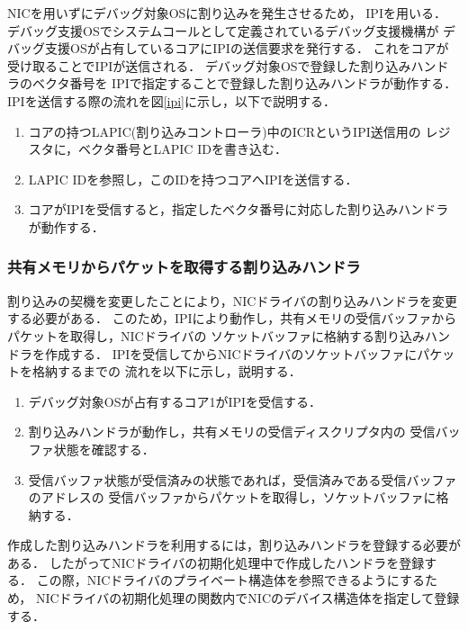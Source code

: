\documentclass[submit,techreq,noauthor,dvipdfmx]{ipsj}
\begin{document}

NICを用いずにデバッグ対象OSに割り込みを発生させるため，
IPIを用いる．
デバッグ支援OSでシステムコールとして定義されているデバッグ支援機構が
デバッグ支援OSが占有しているコアにIPIの送信要求を発行する．
これをコアが受け取ることでIPIが送信される．
デバッグ対象OSで登録した割り込みハンドラのベクタ番号を
IPIで指定することで登録した割り込みハンドラが動作する．
IPIを送信する際の流れを図\ref{ipi}に示し，以下で説明する．

\begin{enumerate}
    \item 
        コアの持つLAPIC(割り込みコントローラ)中のICRというIPI送信用の
        レジスタに，ベクタ番号とLAPIC IDを書き込む．
    \item 
        LAPIC IDを参照し，このIDを持つコアへIPIを送信する．
    \item 
        コアがIPIを受信すると，指定したベクタ番号に対応した割り込みハンドラが動作する．
\end{enumerate}

\subsubsection{共有メモリからパケットを取得する割り込みハンドラ}\label{sec:interrupt_handler_acquisition_packet_from_shared_memory}

割り込みの契機を変更したことにより，NICドライバの割り込みハンドラを変更する必要がある．
このため，IPIにより動作し，共有メモリの受信バッファからパケットを取得し，NICドライバの
ソケットバッファに格納する割り込みハンドラを作成する．
IPIを受信してからNICドライバのソケットバッファにパケットを格納するまでの
流れを以下に示し，説明する．
\begin{enumerate}
    \item 
        デバッグ対象OSが占有するコア1がIPIを受信する．
    \item 
        割り込みハンドラが動作し，共有メモリの受信ディスクリプタ内の
        受信バッファ状態を確認する．
    \item 
        受信バッファ状態が受信済みの状態であれば，受信済みである受信バッファのアドレスの
        受信バッファからパケットを取得し，ソケットバッファに格納する．
\end{enumerate}

作成した割り込みハンドラを利用するには，割り込みハンドラを登録する必要がある．
したがってNICドライバの初期化処理中で作成したハンドラを登録する．
この際，NICドライバのプライベート構造体を参照できるようにするため，
NICドライバの初期化処理の関数内でNICのデバイス構造体を指定して登録する．
\end{document}
